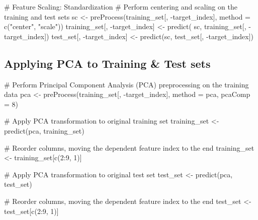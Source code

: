\documentclass[
  letterpaper,
  DIV=11,
  numbers=noendperiod]{scrreprt}
\newenvironment{Shaded}{\begin{snugshade}}{\end{snugshade}}
\newcommand{\AttributeTok}[1]{\textcolor[rgb]{0.40,0.45,0.13}{#1}}
\newcommand{\CommentTok}[1]{\textcolor[rgb]{0.37,0.37,0.37}{#1}}
\newcommand{\DecValTok}[1]{\textcolor[rgb]{0.68,0.00,0.00}{#1}}
\newcommand{\FunctionTok}[1]{\textcolor[rgb]{0.28,0.35,0.67}{#1}}
\newcommand{\NormalTok}[1]{\textcolor[rgb]{0.00,0.23,0.31}{#1}}
\newcommand{\OtherTok}[1]{\textcolor[rgb]{0.00,0.23,0.31}{#1}}
\newcommand{\SpecialCharTok}[1]{\textcolor[rgb]{0.37,0.37,0.37}{#1}}
\newcommand{\StringTok}[1]{\textcolor[rgb]{0.13,0.47,0.30}{#1}}
\begin{document}
\begin{Shaded}
\begin{Highlighting}[]
\CommentTok{\# Feature Scaling: Standardization}
\CommentTok{\# Perform centering and scaling on the training and test sets}
\NormalTok{sc }\OtherTok{\textless{}{-}} \FunctionTok{preProcess}\NormalTok{(training\_set[, }\SpecialCharTok{{-}}\NormalTok{target\_index], }
                 \AttributeTok{method =} \FunctionTok{c}\NormalTok{(}\StringTok{"center"}\NormalTok{, }\StringTok{"scale"}\NormalTok{))}
\NormalTok{training\_set[, }\SpecialCharTok{{-}}\NormalTok{target\_index] }\OtherTok{\textless{}{-}} \FunctionTok{predict}\NormalTok{(}
\NormalTok{  sc, training\_set[, }\SpecialCharTok{{-}}\NormalTok{target\_index])}
\NormalTok{test\_set[, }\SpecialCharTok{{-}}\NormalTok{target\_index] }\OtherTok{\textless{}{-}} \FunctionTok{predict}\NormalTok{(sc, test\_set[, }\SpecialCharTok{{-}}\NormalTok{target\_index])}
\end{Highlighting}
\end{Shaded}

\hypertarget{applying-pca-to-training-test-sets}{%
\subsection{Applying PCA to Training \& Test
sets}\label{applying-pca-to-training-test-sets}}

\begin{Shaded}
\begin{Highlighting}[]
\CommentTok{\# Perform Principal Component Analysis (PCA) preprocessing on the training data}
\NormalTok{pca }\OtherTok{\textless{}{-}} \FunctionTok{preProcess}\NormalTok{(training\_set[, }\SpecialCharTok{{-}}\NormalTok{target\_index], }
                  \AttributeTok{method =} \StringTok{\textquotesingle{}pca\textquotesingle{}}\NormalTok{, }\AttributeTok{pcaComp =} \DecValTok{8}\NormalTok{)}

\CommentTok{\# Apply PCA transformation to original training set}
\NormalTok{training\_set }\OtherTok{\textless{}{-}} \FunctionTok{predict}\NormalTok{(pca, training\_set)}

\CommentTok{\# Reorder columns, moving the dependent feature index to the end}
\NormalTok{training\_set }\OtherTok{\textless{}{-}}\NormalTok{ training\_set[}\FunctionTok{c}\NormalTok{(}\DecValTok{2}\SpecialCharTok{:}\DecValTok{9}\NormalTok{, }\DecValTok{1}\NormalTok{)]}

\CommentTok{\# Apply PCA transformation to original test set}
\NormalTok{test\_set }\OtherTok{\textless{}{-}} \FunctionTok{predict}\NormalTok{(pca, test\_set)}

\CommentTok{\# Reorder columns, moving the dependent feature index to the end}
\NormalTok{test\_set }\OtherTok{\textless{}{-}}\NormalTok{ test\_set[}\FunctionTok{c}\NormalTok{(}\DecValTok{2}\SpecialCharTok{:}\DecValTok{9}\NormalTok{, }\DecValTok{1}\NormalTok{)]}
\end{Highlighting}
\end{Shaded}
\end{document}
